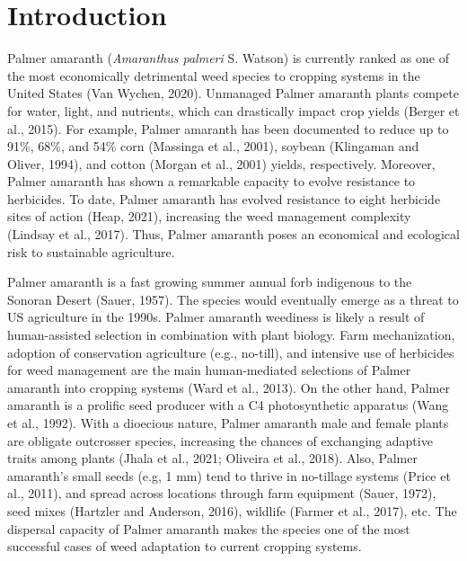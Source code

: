 \documentclass[utf8]{frontiersSCNS}
\begin{document}
\hypertarget{introduction}{%
\section*{Introduction}\label{introduction}}

Palmer amaranth (\emph{Amaranthus palmeri} S. Watson) is currently
ranked as one of the most economically detrimental weed species to
cropping systems in the United States (Van Wychen, 2020). Unmanaged
Palmer amaranth plants compete for water, light, and nutrients, which
can drastically impact crop yields (Berger et al., 2015). For example,
Palmer amaranth has been documented to reduce up to 91\%, 68\%, and 54\%
corn (Massinga et al., 2001), soybean (Klingaman and Oliver, 1994), and
cotton (Morgan et al., 2001) yields, respectively. Moreover, Palmer
amaranth has shown a remarkable capacity to evolve resistance to
herbicides. To date, Palmer amaranth has evolved resistance to eight
herbicide sites of action (Heap, 2021), increasing the weed management
complexity (Lindsay et al., 2017). Thus, Palmer amaranth poses an
economical and ecological risk to sustainable agriculture.

Palmer amaranth is a fast growing summer annual forb indigenous to the
Sonoran Desert (Sauer, 1957). The species would eventually emerge as a
threat to US agriculture in the 1990s. Palmer amaranth weediness is
likely a result of human-assisted selection in combination with plant
biology. Farm mechanization, adoption of conservation agriculture (e.g.,
no-till), and intensive use of herbicides for weed management are the
main human-mediated selections of Palmer amaranth into cropping systems
(Ward et al., 2013). On the other hand, Palmer amaranth is a prolific
seed producer with a C4 photosynthetic apparatus (Wang et al., 1992).
With a dioecious nature, Palmer amaranth male and female plants are
obligate outcrosser species, increasing the chances of exchanging
adaptive traits among plants (Jhala et al., 2021; Oliveira et al.,
2018). Also, Palmer amaranth's small seeds (e.g, 1 mm) tend to thrive in
no-tillage systems (Price et al., 2011), and spread across locations
through farm equipment (Sauer, 1972), seed mixes (Hartzler and Anderson,
2016), wildlife (Farmer et al., 2017), etc. The dispersal capacity of
Palmer amaranth makes the species one of the most successful cases of
weed adaptation to current cropping systems.
\end{document}
